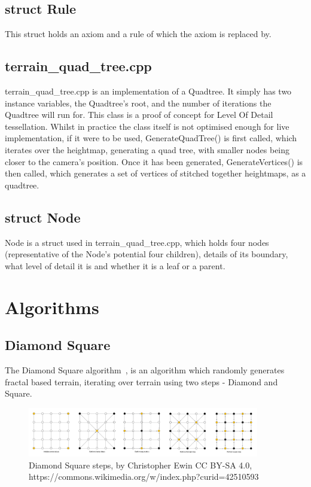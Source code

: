 \documentclass[a4paper,10pt]{report}
\begin{document}
\subsection{struct Rule}
This struct holds an axiom and a rule of which the axiom is replaced by. 

\subsection{terrain\_quad\_tree.cpp}
terrain\_quad\_tree.cpp is an implementation of a Quadtree. It simply has two instance variables, the Quadtree's root, and the number of iterations the Quadtree will run for. This class is a proof of concept for Level Of Detail tessellation. Whilst in practice the class itself is not optimised enough for live implementation, if it were to be used, GenerateQuadTree() is first called, which iterates over the heightmap, generating a quad tree, with smaller nodes being closer to the camera's position. Once it has been generated, GenerateVertices() is then called, which generates a set of vertices of stitched together heightmaps, as a quadtree. 

\subsection{struct Node}
Node is a struct used in terrain\_quad\_tree.cpp, which holds four nodes (representative of the Node's potential four children), details of its boundary, what level of detail it is and whether it is a leaf or a parent.


\clearpage

\section{Algorithms}
\subsection{Diamond Square}
The Diamond Square algorithm~\cite{miller1986definition}, is an algorithm which randomly generates fractal based terrain, iterating over terrain using two steps - Diamond and Square. \medskip 

\begin{figure}[h!]
    \centering
  \includegraphics[width=0.9\textwidth]{Images/External/Diamond_Square.png}
 \caption[Diamond Square steps, by Christopher Ewin]{Diamond Square steps, by Christopher Ewin CC BY-SA 4.0, https://commons.wikimedia.org/w/index.php?curid=42510593}
 \label{fig:diamond_square_steps}
\end{figure} 
\end{document}
